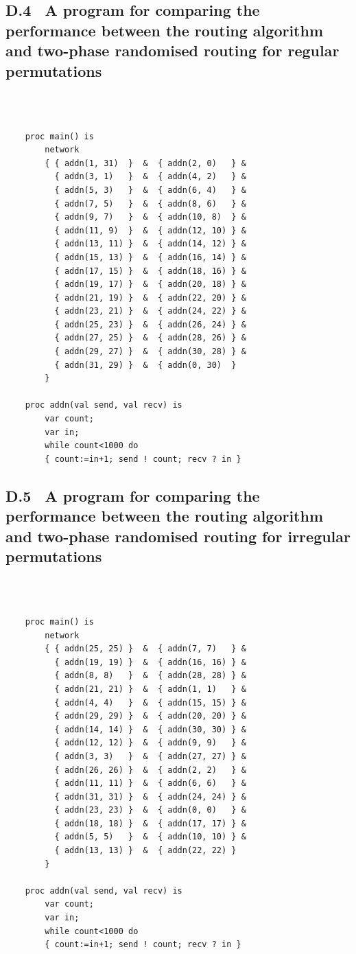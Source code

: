 \documentclass[a4paper, 12pt]{article}
\begin{document}
\newpage
\subsection*{D.4 \ A program for comparing the performance between the routing algorithm and two-phase randomised routing for regular permutations}
\ 
\begin{lstlisting}

    proc main() is
        network
        { { addn(1, 31)  }  &  { addn(2, 0)   } &
          { addn(3, 1)   }  &  { addn(4, 2)   } &
          { addn(5, 3)   }  &  { addn(6, 4)   } &
          { addn(7, 5)   }  &  { addn(8, 6)   } &
          { addn(9, 7)   }  &  { addn(10, 8)  } &
          { addn(11, 9)  }  &  { addn(12, 10) } &
          { addn(13, 11) }  &  { addn(14, 12) } &
          { addn(15, 13) }  &  { addn(16, 14) } &
          { addn(17, 15) }  &  { addn(18, 16) } &
          { addn(19, 17) }  &  { addn(20, 18) } &
          { addn(21, 19) }  &  { addn(22, 20) } &
          { addn(23, 21) }  &  { addn(24, 22) } &
          { addn(25, 23) }  &  { addn(26, 24) } &
          { addn(27, 25) }  &  { addn(28, 26) } &
          { addn(29, 27) }  &  { addn(30, 28) } &
          { addn(31, 29) }  &  { addn(0, 30)  }
        }

    proc addn(val send, val recv) is 
        var count;
        var in;
        while count<1000 do
        { count:=in+1; send ! count; recv ? in }

\end{lstlisting}

\newpage
\subsection*{D.5 \ A program for comparing the performance between the routing algorithm and two-phase randomised routing for irregular permutations}
\ 
\begin{lstlisting}

    proc main() is
        network
        { { addn(25, 25) }  &  { addn(7, 7)   } &
          { addn(19, 19) }  &  { addn(16, 16) } &
          { addn(8, 8)   }  &  { addn(28, 28) } &
          { addn(21, 21) }  &  { addn(1, 1)   } &
          { addn(4, 4)   }  &  { addn(15, 15) } &
          { addn(29, 29) }  &  { addn(20, 20) } &
          { addn(14, 14) }  &  { addn(30, 30) } &
          { addn(12, 12) }  &  { addn(9, 9)   } &
          { addn(3, 3)   }  &  { addn(27, 27) } &
          { addn(26, 26) }  &  { addn(2, 2)   } &
          { addn(11, 11) }  &  { addn(6, 6)   } &
          { addn(31, 31) }  &  { addn(24, 24) } &
          { addn(23, 23) }  &  { addn(0, 0)   } &
          { addn(18, 18) }  &  { addn(17, 17) } &
          { addn(5, 5)   }  &  { addn(10, 10) } &
          { addn(13, 13) }  &  { addn(22, 22) }
        }

    proc addn(val send, val recv) is 
        var count;
        var in;
        while count<1000 do
        { count:=in+1; send ! count; recv ? in }

\end{lstlisting}
\end{document}
